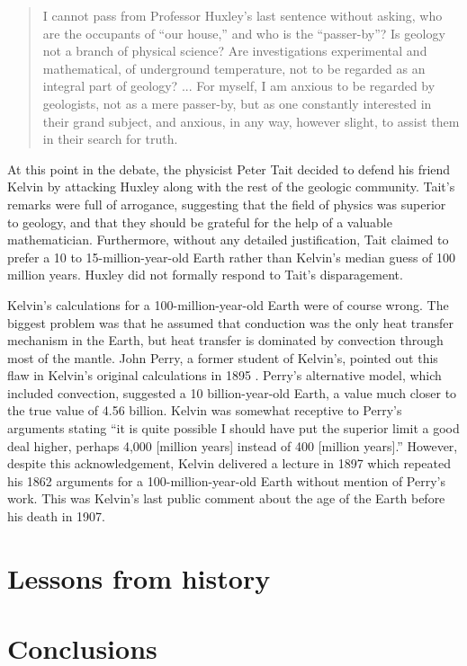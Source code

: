 \documentclass[12pt]{article}
\begin{document}
\begin{quote}
  I cannot pass from Professor Huxley's last sentence without asking, who are the occupants of ``our house,'' and who is the ``passer-by''? Is geology not a branch of physical science? Are investigations experimental and mathematical, of underground temperature, not to be regarded as an integral part of geology? ... For myself, I am anxious to be regarded by geologists, not as a mere passer-by, but as one constantly interested in their grand subject, and anxious, in any way, however slight, to assist them in their search for truth.
\end{quote}

At this point in the debate, the physicist Peter Tait decided to defend his friend Kelvin by attacking Huxley along with the rest of the geologic community. Tait's remarks were full of arrogance, suggesting that the field of physics was superior to geology, and that they should be grateful for the help of a valuable mathematician. Furthermore, without any detailed justification, Tait claimed to prefer a 10 to 15-million-year-old Earth rather than Kelvin's median guess of 100 million years. Huxley did not formally respond to Tait's disparagement.

Kelvin's calculations for a 100-million-year-old Earth were of course wrong. The biggest problem was that he assumed that conduction was the only heat transfer mechanism in the Earth, but heat transfer is dominated by convection through most of the mantle. John Perry, a former student of Kelvin's, pointed out this flaw in Kelvin's original calculations in 1895 \citep{England_2007}. Perry's alternative model, which included convection, suggested a 10 billion-year-old Earth, a value much closer to the true value of 4.56 billion. Kelvin was somewhat receptive to Perry's arguments stating ``it is quite possible I should have put the superior limit a good deal higher, perhaps 4,000 [million years] instead of 400 [million years].'' However, despite this acknowledgement, Kelvin delivered a lecture in 1897 which repeated his 1862 arguments for a 100-million-year-old Earth without mention of Perry's work. This was Kelvin's last public comment about the age of the Earth before his death in 1907.

\section{Lessons from history} \label{sec:3}

\section{Conclusions} \label{sec:4}



\end{document}
